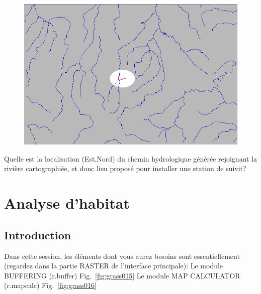\begin{figure}[htbp]
   \centering
   \includegraphics[scale=0.35]{grass014.png}
   \caption{}
   \label{fig:grass014}
\end{figure}

Quelle est la localisation (Est,Nord) du chemin hydrologique g\'en\'er\'ee rejoignant la rivi\`ere cartographi\'ee, et donc lieu propos\'e pour installer une station de suivit?

\section{Analyse d'habitat}
\subsection{Introduction}

Dans cette session, les \'el\'ements dont vous aurez besoins sont essentiellement (regardez dans la partie RASTER de l'interface principale): 
Le module BUFFERING (r.buffer) Fig.~\ref{fig:grass015}
Le module MAP CALCULATOR (r.mapcalc) Fig.~\ref{fig:grass016}

